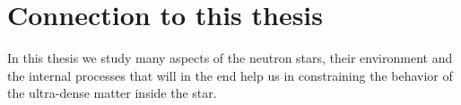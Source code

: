 %
%




\section{Connection to this thesis}
In this thesis we study many aspects of the neutron stars, their environment and the internal processes that will in the end help us in constraining the behavior of the ultra-dense matter inside the star.
